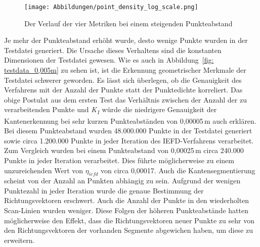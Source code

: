 \begin{figure}[t]
	\texttt{[image: Abbildungen/point\_density\_log\_scale.png]}
	\centering
	\caption[Verhältnis zwischen Genauigkeit und Punkteabstand]{Der Verlauf der vier Metriken bei einem steigenden Punkteabstand}
	\label{fig: point_density_trend}
\end{figure}

Je mehr der Punkteabstand erhöht wurde, desto wenige Punkte wurden in der Testdatei generiert. Die Ursache dieses Verhaltens sind die konstanten Dimensionen der Testdatei gewesen. Wie es auch in Abbildung~\ref{fig: testdata_0,005m} zu sehen ist, ist die Erkennung geometrischer Merkmale der Testdatei schwerer geworden. Es lässt sich überlegen, ob die Genauigkeit des Verfahrens mit der Anzahl der Punkte statt der Punktedichte korreliert. Das obige Postulat aus dem ersten Test \textendash{} das Verhältnis zwischen der Anzahl der zu verarbeitenden Punkte und \textit{K\textsubscript{1}} \textendash{} würde die niedrigere Genauigkeit der Kantenerkennung bei sehr kurzen Punkteabständen von 0,00005\,\si{\m} auch erklären. Bei diesem Punkteabstand wurden 48.000.000 Punkte in der Testdatei generiert sowie circa 1.200.000 Punkte in jeder Iteration des IEFD-Verfahrens verarbeitet. Zum Vergleich wurden bei einem Punkteabstand von 0,00025\,\si{\m} circa 240.000 Punkte in jeder Iteration verarbeitet. Dies führte möglicherweise zu einem unzureichenden Wert von $\eta_{iefd}$ von circa 0,00017. Auch die Kantensegmentierung scheint von der Anzahl an Punkten abhängig zu sein. Aufgrund der wenigen Punktezahl in jeder Iteration  wurde die genaue Bestimmung der Richtungsvektoren erschwert. Auch die Anzahl der Punkte in den wiederholten Scan-Linien wurden weniger. Diese Folgen der höheren Punkteabstände hatten möglicherweise den Effekt, dass die Richtungsvektoren neuer Punkte zu sehr von den Richtungsvektoren der vorhanden Segmente abgewichen haben, um diese zu erweitern. 

